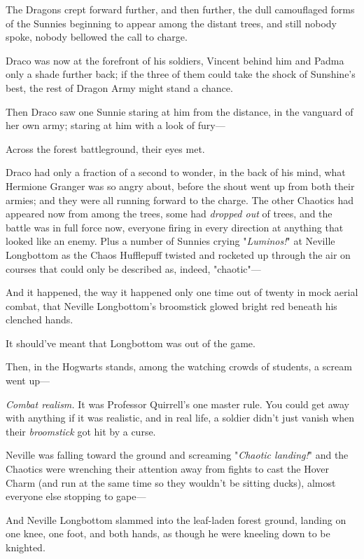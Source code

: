 The Dragons crept forward further, and then further, the dull camouflaged forms 
of the Sunnies beginning to appear among the distant trees, and still nobody 
spoke, nobody bellowed the call to charge.

Draco was now at the forefront of his soldiers, Vincent behind him and Padma 
only a shade further back; if the three of them could take the shock of 
Sunshine's best, the rest of Dragon Army might stand a chance.

Then Draco saw one Sunnie staring at him from the distance, in the vanguard of 
her own army; staring at him with a look of fury---

Across the forest battleground, their eyes met.

Draco had only a fraction of a second to wonder, in the back of his mind, what 
Hermione Granger was so angry about, before the shout went up from both their 
armies; and they were all running forward to the charge.
\sbreak
The other Chaotics had appeared now from among the trees, some had 
\emph{dropped out} of trees, and the battle was in full force now, everyone 
firing in every direction at anything that looked like an enemy. Plus a number 
of Sunnies crying "\emph{Luminos!}" at Neville Longbottom as the Chaos 
Hufflepuff twisted and rocketed up through the air on courses that could only 
be described as, indeed, "chaotic"---

And it happened, the way it happened only one time out of twenty in mock aerial 
combat, that Neville Longbottom's broomstick glowed bright red beneath his 
clenched hands.

It should've meant that Longbottom was out of the game.

Then, in the Hogwarts stands, among the watching crowds of students, a scream 
went up---

\emph{Combat realism.} It was Professor Quirrell's one master rule. You could 
get away with anything if it was realistic, and in real life, a soldier didn't 
just vanish when their \emph{broomstick} got hit by a curse.

Neville was falling toward the ground and screaming "\emph{Chaotic landing!}" 
and the Chaotics were wrenching their attention away from fights to cast the 
Hover Charm (and run at the same time so they wouldn't be sitting ducks), 
almost everyone else stopping to gape---

And Neville Longbottom slammed into the leaf-laden forest ground, landing on 
one knee, one foot, and both hands, as though he were kneeling down to be 
knighted.

